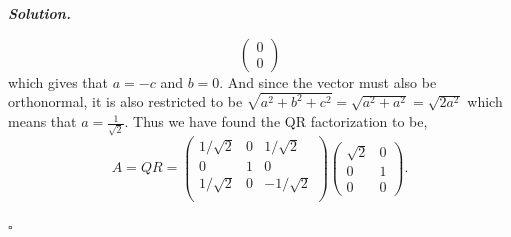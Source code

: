 \documentclass[12pt]{report}
\newenvironment{solution}[1][\it{Solution}]{\textbf{#1. } }{$\square$}
\begin{document}
\begin{solution}
\begin{enumerate}
\[\begin{pmatrix}
                0\\0
            \end{pmatrix}
        \]
        which gives that $a=-c$ and $b=0$. And since the vector must also be orthonormal, it is also restricted to be $\sqrt{a^2 + b^2 + c^2} = \sqrt{a^2 + a^2} = \sqrt{2a^2}$ which means that $a = \frac{1}{\sqrt{2}}$. Thus we have found the QR factorization to be,
        \[ 
            A = QR = \begin{pmatrix}
                1/\sqrt{2}&0&1/\sqrt{2}\\
                0&1&0\\
                1/\sqrt{2}&0&-1/\sqrt{2}\\
            \end{pmatrix}\begin{pmatrix}
                \sqrt{2}&0\\ 0&1\\ 0&0 
            \end{pmatrix}.
        \]


\end{enumerate}
\end{solution}
\end{document}
